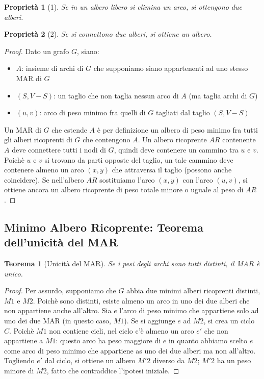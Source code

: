 \documentclass[11pt]{article}
\newtheorem*{theorem}{Teorema}
\newtheorem*{proprietà}{Proprietà}
\begin{document}
\begin{proprietà}[1]
    Se in un albero libero si elimina un arco, si ottengono due alberi.
\end{proprietà}
\begin{proprietà}[2]
    Se si connettono due alberi, si ottiene un albero.
\end{proprietà}
\begin{proof}
    Dato un grafo $G$, siano:
    \begin{itemize}
        \item $A$: insieme di archi di $G$ che supponiamo siano appartenenti ad uno stesso MAR di $G$
        \item $(S,V-S)$: un taglio che non taglia nessun arco di $A$ (ma taglia archi di $G$)
        \item $(u,v)$: arco di peso minimo fra quelli di $G$ tagliati dal taglio $(S,V-S)$
    \end{itemize}
    Un MAR di $G$ che estende $A$ è per definizione un albero di peso minimo fra tutti gli alberi ricoprenti  di $G$ che 
    contengono $A$. Un albero ricoprente $AR$ contenente $A$ deve connettere tutti i nodi di $G$, quindi deve contenere 
    un cammino tra $u$ e $v$. Poichè $u$ e $v$ si trovano da parti opposte del taglio, un tale cammino deve contenere almeno 
    un arco $(x,y)$ che attraversa il taglio (possono anche coincidere). Se nell'albero $AR$ sostituiamo l'arco $(x,y)$
    con l'arco $(u,v)$, si ottiene ancora un albero ricoprente di peso totale minore o uguale al peso di $AR$. 
\end{proof}
\subsection*{Minimo Albero Ricoprente: Teorema dell'unicità del MAR}
\begin{theorem}[Unicità del MAR]
    Se i pesi degli archi sono tutti distinti, il MAR è unico.
\end{theorem}
\begin{proof}
    Per assurdo, supponiamo che $G$ abbia due minimi alberi ricoprenti distinti, $M1$ e $M2$. Poichè sono distinti, esiste 
    almeno un arco in uno dei due alberi che non appartiene anche all'altro. Sia $e$ l'arco di peso minimo che appartiene 
    solo ad uno dei due MAR (in questo caso, $M1$). Se si aggiunge $e$ ad $M2$, si crea un ciclo $C$. Poichè $M1$ non 
    contiene cicli, nel ciclo c'è almeno un arco $e'$ che non appartiene a $M1$: questo arco ha peso maggiore di $e$ in 
    quanto abbiamo scelto $e$ come arco di peso minimo che appartiene as uno dei due alberi ma non all'altro.\\
    Togliendo $e'$ dal ciclo, si ottiene un albero $M'2$ diverso da $M2$; $M'2$ ha un peso minore di $M2$, fatto che contraddice 
    l'ipotesi iniziale.
\end{proof}
\end{document}
